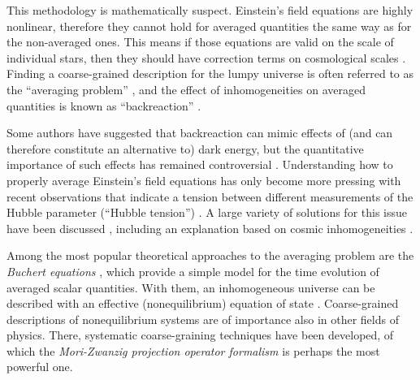 \documentclass[aps,prl,11pt,nofootinbib]{revtex4-1}
\newcommand{\ZT}[1]{\textquotedblleft#1\textquotedblright}%
\begin{document}
This methodology is mathematically suspect. Einstein's field equations are highly nonlinear, therefore they cannot hold for averaged quantities the same way as for the non-averaged ones. This means if those equations are valid on the scale of individual stars, then they should have correction terms on cosmological scales \cite{ClarksonELU2011}. Finding a coarse-grained description for the lumpy universe is often referred to as the \ZT{averaging problem} \cite{ClarksonELU2011,Wiltshire2007,Wiltshire2011,Zalaletdinov2008,Ginat2021,Paranjape2009,Buchert2011}, and the effect of inhomogeneities on averaged quantities is known as \ZT{backreaction} \cite{ClarksonELU2011,Rasanen2011}.
 
Some authors have suggested that backreaction can mimic effects of (and can therefore constitute an alternative to) dark energy, but the quantitative importance of such effects has remained controversial \cite{Kolb2011,ClarksonELU2011,BuchertEtAl2015,Buchert2005}. Understanding how to properly average Einstein's field equations has only become more pressing with recent observations that indicate a tension between different measurements of the Hubble parameter (\ZT{Hubble tension}) \cite{PoulinSKK2019,JedamzikP2020,BerghausK2020,Freedman2017,Riess2020}. A large variety of solutions for this issue have been discussed \cite{DiValentinoEtAl2021}, including an explanation based on cosmic inhomogeneities \cite{HeinesenB2020,Bolejko2018,MacphersonLP2018}.

Among the most popular theoretical approaches to the averaging problem are the \textit{Buchert equations} \cite{Buchert2000,Buchert2001,BuchertMR2020}, which provide a simple model for the time evolution of averaged scalar quantities. With them, an inhomogeneous universe can be described with an effective (nonequilibrium) equation of state \cite{Buchert2005}. Coarse-grained descriptions of nonequilibrium systems are of importance also in other fields of physics. There, systematic coarse-graining techniques have been developed, of which the \textit{Mori-Zwanzig projection operator formalism} \cite{Mori1965,Zwanzig1960,Nakajima1958,teVrugtW2019,MeyerVS2017,MeyerVS2019} is perhaps the most powerful one. 
\end{document}
